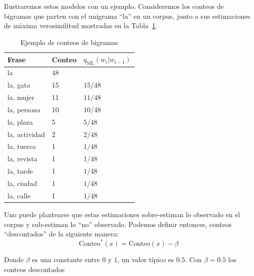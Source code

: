 \documentclass[11pt,fleqn]{book} %
\begin{document}
Ilustraremos estos modelos con un ejemplo. Consideremos los conteos de bigramas que parten con el unigrama ``la'' en un corpus, junto a sus estimaciones de máxima verosimilitud mostradas en la Tabla~\ref{tab:ej}.


\begin{table}[h]
    \centering
    \begin{tabular}{|l|l|l|}\hline
        \textbf{Frase} & \textbf{Conteo} & \textbf{$q_{\text{ML}}(w_i | w_{i-1})$} \\
        \hline
        la & 48 & \\
        la, gata & 15 & $15/48$ \\
        la, mujer & 11 & $11/48$ \\
        la, persona & 10 & $10/48$ \\
        la, plaza & 5 & $5/48$ \\
        la, actividad & 2 & $2/48$ \\
        la, tuerca & 1 & $1/48$ \\
        la, revista & 1 & $1/48$ \\
        la, tarde & 1 & $1/48$ \\
        la, ciudad & 1 & $1/48$ \\
        la, calle & 1 & $1/48$ \\ \hline
    \end{tabular}\caption{Ejemplo de conteos de bigramas}\label{tab:ej}
\end{table}

Uno puede plantearse que estas estimaciones sobre-estiman lo observado en el corpus y sub-estiman lo ``no'' observado.
Podemos definir entonces, conteos ``descontados'' de la siguiente manera:
    \[
    \text{Conteo}^*(x) = \text{Conteo}(x) - \beta
    \]

Donde $\beta$ es una constante entre $0$ y $1$, un valor típico es $0.5$. Con $\beta=0.5$ los conteos descontados   
\end{document}
